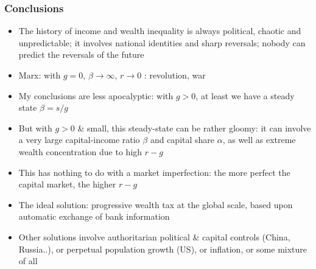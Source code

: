 \documentclass[t]{beamer}\usepackage[]{graphicx}\usepackage[]{color}
\begin{document}
\begin{frame}[label=Conclusions1]
\frametitle{Conclusions}
\begin{itemize}
\item
The history of income and wealth inequality is always political, chaotic and unpredictable; it involves national identities and sharp reversals; nobody can predict the reversals of the future
\item
Marx: with $g=0$, $\beta\rightarrow\infty$, $r\rightarrow 0$ : revolution, war
\item
My conclusions are less apocalyptic: with $g>0$, at least we have a steady state $\beta=s/g$
\item
But with $g>0$ \& small, this steady-state can be rather gloomy: it can involve a very large capital-income ratio $\beta$ and capital share $\alpha$, as well as extreme wealth concentration due to high $r-g$
\item
This has nothing to do with a market imperfection: the more perfect the capital market, the higher $r-g$
\item
The ideal solution: progressive wealth tax at the global scale, based upon automatic exchange of bank information
\item
Other solutions involve authoritarian political \& capital controls (China, Russia..), or perpetual population growth (US), or inflation, or some mixture of all
\end{itemize}
\end{frame}
\end{document}
